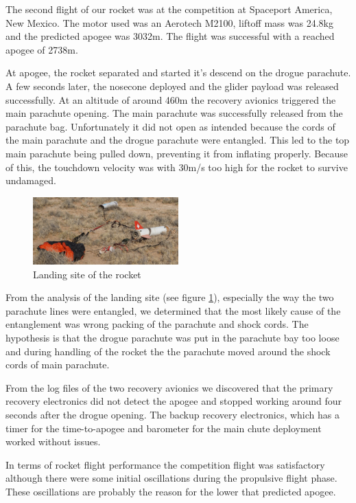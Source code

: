 The second flight of our rocket was at the competition at Spaceport America, New Mexico.
The motor used was an Aerotech M2100, liftoff mass was 24.8kg and the predicted apogee was 3032m.
The flight was successful with a reached apogee of 2738m.

At apogee, the rocket separated and started it's descend on the drogue parachute. A few seconds later, the nosecone deployed and the glider payload was released successfully.
At an altitude of around 460m the recovery avionics triggered the main parachute opening.
The main parachute was successfully released from the parachute bag. Unfortunately it did not open as intended because the cords of the main parachute and the drogue parachute were entangled. This led to the top main parachute being pulled down, preventing it from inflating properly.
Because of this, the touchdown velocity was with 30m/s too high for the rocket to survive undamaged.

\begin{figure}[h!]
    \centering
        \includegraphics[width=0.5\textwidth]{img/landing_site.jpg}
        \caption{Landing site of the rocket}
        \label{fig:landing_site}
 \end{figure}

From the analysis of the landing site (see figure \ref{fig:landing_site}), especially the way the two parachute lines were entangled, we determined that the most likely cause of the entanglement was wrong packing of the parachute and shock cords.
The hypothesis is that the drogue parachute was put in the parachute bay too loose and during handling of the rocket the the parachute moved around the shock cords of main parachute.

From the log files of the two recovery avionics we discovered that the primary recovery electronics did not detect the apogee and stopped working around four seconds after the drogue opening.
The backup recovery electronics, which has a timer for the time-to-apogee and barometer for the main chute deployment worked without issues.

In terms of rocket flight performance the competition flight was satisfactory although there were some initial oscillations during the propulsive flight phase.
These oscillations are probably the reason for the lower that predicted apogee.

